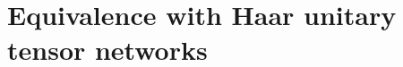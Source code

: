 \documentclass[a4paper,11pt]{article}
\begin{document}





\section{Equivalence with Haar unitary tensor networks}
\label{equiv_haar_wick_app}
\end{document}
